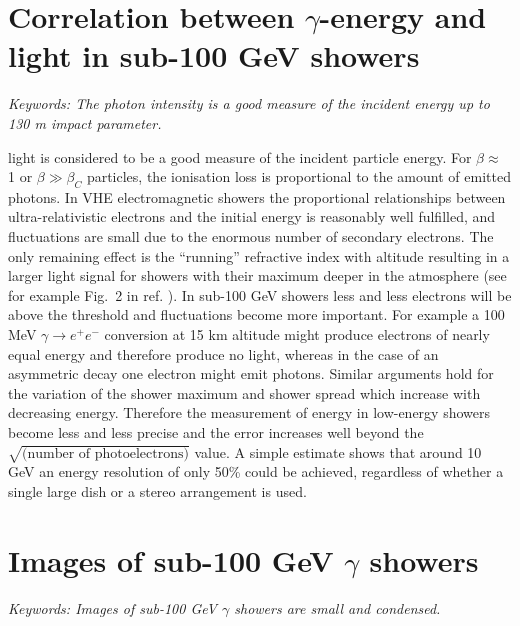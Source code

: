 \section{Correlation between $\gamma$-energy 
and \Cerenkov light in sub-100 GeV showers}
\par\medskip
{\it Keywords: The photon intensity is a good measure of the incident
energy up to 130 m impact parameter.}

\par\medskip \Cerenkov light is considered to be a  good measure of the 
incident particle energy. For $\beta \approx$ 1
or $\beta \gg \beta_C$ particles, the ionisation loss is 
proportional to the amount of emitted 
\Cerenkov photons. In VHE electromagnetic showers the 
proportional relationships between ultra-relativistic 
electrons and the initial energy is reasonably well 
fulfilled, and fluctuations are small due 
to the enormous number of secondary electrons. The 
only remaining effect is the ``running''
refractive index with altitude resulting in a larger
light signal for showers with their 
maximum deeper in the atmosphere (see for example
Fig.~2 in ref. \cite{lorenz:96}).
In sub-100 GeV showers less 
and less electrons will be above the 
\Cerenkov threshold and fluctuations become more important. 
For example a 100 MeV $\gamma \to e^ + e^-$ 
conversion at 15 km altitude might produce electrons 
of nearly equal energy and 
therefore produce no light, whereas in the case of an asymmetric
decay one electron might emit 
photons. Similar arguments hold for the variation of the 
shower maximum and shower spread 
which increase with decreasing energy. Therefore the 
measurement of energy in low-energy 
showers become less and less precise and the error 
increases well beyond the $\sqrt{\mbox{(number of 
photoelectrons)}}$ value. A simple estimate shows that 
around 10 GeV an energy resolution 
of only 50\% could be achieved, regardless of whether a single 
large dish or a stereo arrangement is used.


\section{Images of sub-100 GeV $\gamma$ showers}
\par\medskip
{\it Keywords: Images of sub-100 GeV $\gamma$ showers are small and
condensed.} 

